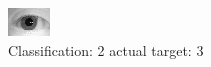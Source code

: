 \begin{figure}[h!]
\begin{center}
\includegraphics[width=0.60\columnwidth]{figures/ID1114_class_2_target_3.png}
\end{center}
\caption{ Classification: 2 actual target: 3}
\label{fig:ID1114_class_2_target_3}
\end{figure}
